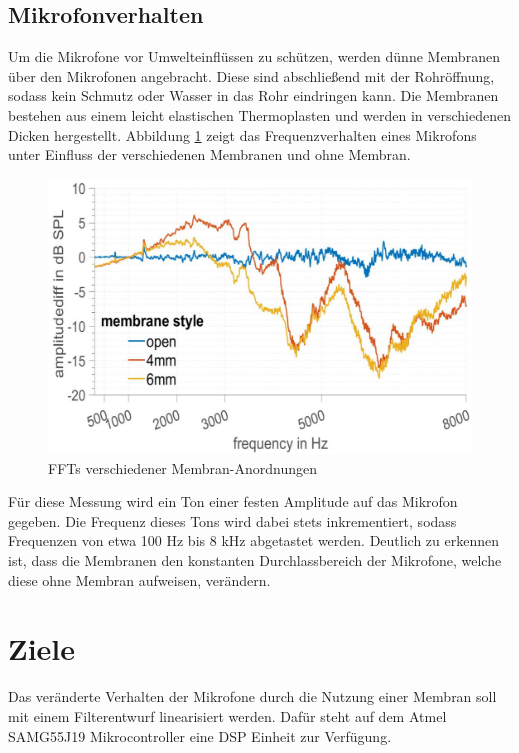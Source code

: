 \newpage
\subsection{Mikrofonverhalten}

Um die Mikrofone vor Umwelteinflüssen zu schützen, werden dünne Membranen über den Mikrofonen angebracht. Diese sind abschließend mit der Rohröffnung, sodass kein Schmutz oder Wasser in das Rohr eindringen kann. Die Membranen bestehen aus einem leicht elastischen Thermoplasten und werden in verschiedenen Dicken hergestellt. Abbildung \ref{fig:membranefft} zeigt das Frequenzverhalten eines Mikrofons unter Einfluss der verschiedenen Membranen und ohne Membran.

\begin{figure}[H]
	\centering
	\includegraphics[width=0.9\linewidth]{images/membrane_fft}
	\caption{FFTs verschiedener Membran-Anordnungen}
	\label{fig:membranefft}
\end{figure}

Für diese Messung wird ein Ton einer festen Amplitude auf das Mikrofon gegeben. Die Frequenz dieses Tons wird dabei stets inkrementiert, sodass Frequenzen von etwa 100 Hz bis 8 kHz abgetastet werden. Deutlich zu erkennen ist, dass die Membranen den konstanten Durchlassbereich der Mikrofone, welche diese ohne Membran aufweisen, verändern.

\newpage
\section{Ziele}

Das veränderte Verhalten der Mikrofone durch die Nutzung einer Membran soll mit einem Filterentwurf linearisiert werden. Dafür steht auf dem Atmel SAMG55J19 Mikrocontroller eine DSP Einheit zur Verfügung.

